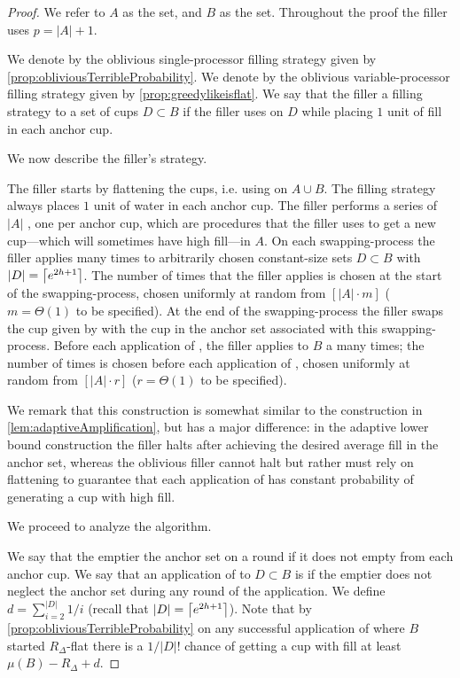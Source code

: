 \begin{proof}
  We refer to $A$ as the  set, and $B$ as the
   set.
  Throughout the proof the filler uses $p=|A|+1$.

We denote by \randalg the oblivious single-processor filling
strategy given by \cref{prop:obliviousTerribleProbability}. 
We denote by \flatalg the oblivious variable-processor filling
strategy given by \cref{prop:greedylikeisflat}.
We say that the filler  a filling strategy
\genericalg to a set of cups $D \subset B$ if the filler uses
\genericalg on $D$ while placing $1$ unit of fill in each anchor cup. 

We now describe the filler's strategy.

The filler starts by flattening the cups, i.e. using \flatalg on
$A\cup B$. The filling strategy always places $1$ unit of water
in each anchor cup. The filler performs a series of $|A|$
, one per anchor cup, which are
procedures that the filler uses to get a new cup---which will
sometimes have high fill---in $A$. On each swapping-process the
filler applies \randalg many times to arbitrarily chosen
constant-size sets $D \subset B$ with $|D| = \left\lceil e^{2h+1} \right\rceil$.
The number of times that the filler applies \randalg is chosen at
the start of the swapping-process, chosen uniformly at random
from $[|A|\cdot m]$ ($m = \Theta(1)$ to be specified). At the end
of the swapping-process the filler swaps the cup given by
\randalg with the cup in the anchor set associated with this
swapping-process. Before each application of \randalg, the filler
applies \flatalg to $B$ a many times; the number of times is
chosen before each application of \randalg, chosen uniformly at
random from $[|A| \cdot r]$ ($r=\Theta(1)$ to be specified). 

We remark that this construction is somewhat similar to
the construction in \cref{lem:adaptiveAmplification}, but has a
major difference: in the adaptive lower bound construction the
filler halts after achieving the desired average fill in the
anchor set, whereas the oblivious filler cannot halt but rather
must rely on flattening to guarantee that each application of
\randalg has constant probability of generating a cup with high
fill.

We proceed to analyze the algorithm.

We say that the emptier  the anchor set on a round
if it does not empty from each anchor cup. We say that an
application of \randalg to $D\subset B$ is  if
the emptier does not neglect the anchor set during any round of
the application. We define $d = \sum_{i=2}^{|D|} 1/i$ (recall
that $|D| = \left\lceil e^{2h+1} \right\rceil$). Note that by
\cref{prop:obliviousTerribleProbability} on any successful
application of \randalg where $B$ started $R_\Delta$-flat there
is a $1/|D|!$ chance of getting a
cup with fill at least $\mu(B) -R_\Delta + d$. 


\end{proof}
